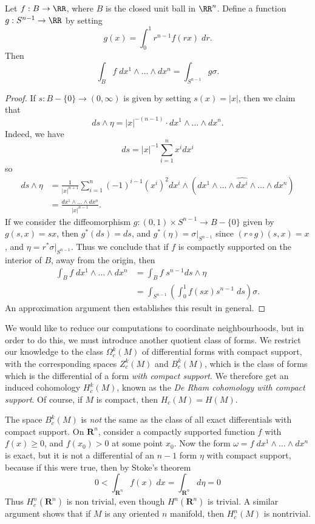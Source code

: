 \begin{theorem}
    Let $f: B \to \RR$, where $B$ is the closed unit ball in $\RR^n$. Define a function $g: S^{n-1} \to \RR$ by setting
    \[ g(x) = \int_0^1 r^{n-1} f(rx)\; dr. \]
    Then
    \[ \int_B f\; dx^1 \wedge \dots \wedge dx^n = \int_{S^{n-1}} g \sigma. \]
\end{theorem}
\begin{proof}
    If $s: B - \{ 0 \} \to (0,\infty)$ is given by setting $s(x) = |x|$, then we claim that
    \[ ds \wedge \eta = |x|^{-(n-1)} \cdot dx^1 \wedge \dots \wedge dx^n. \]
    Indeed, we have
    \[ ds = |x|^{-1} \sum_{i = 1}^n x^i dx^i \]
    so
    \begin{align*}
        ds \wedge \eta &= \frac{1}{|x|^{n+1}} \sum_{i = 1}^n (-1)^{i-1} (x^i)^2 dx^i \wedge (dx^1 \wedge \dots \wedge \widehat{dx^i} \wedge \dots \wedge dx^n)\\
        &= \frac{dx^1 \wedge \dots \wedge dx^n}{|x|^{n-1}}.
    \end{align*}
    If we consider the diffeomorphism $g: (0,1) \times S^{n-1} \to B - \{ 0 \}$ given by $g(s,x) = sx$, then $g^*(ds) = ds$, and $g^*(\eta) = \sigma|_{S^{n-1}}$ since $(r \circ g)(s,x) = x$, and $\eta = r^* \sigma|_{S^{n-1}}$. Thus we conclude that if $f$ is compactly supported on the interior of $B$, away from the origin, then
    \begin{align*}
        \int_B f\; dx^1 \wedge \dots \wedge dx^n &= \int_B f\; s^{n-1} ds \wedge \eta\\
        &= \int_{S^{n-1}} \left( \int_0^1 f(sx) s^{n-1}\; ds \right) \sigma.
    \end{align*}
    An approximation argument then establishes this result in general.
\end{proof}

We would like to reduce our computations to coordinate neighbourhoods, but in order to do this, we must introduce another quotient class of forms. We restrict our knowledge to the class $\Omega^k_c(M)$ of differential forms with compact support, with the corresponding spaces $Z^k_c(M)$ and $B^k_c(M)$, which is the class of forms which is the differential of a form {\it with compact support}. We therefore get an induced cohomology $H^k_c(M)$, known as the \emph{De Rham cohomology with compact support}. Of course, if $M$ is compact, then $H_c(M) = H(M)$.

\begin{example}
    The space $B^k_c(M)$ is {\it not} the same as the class of all exact differentials with compact support. On $\mathbf{R}^n$, consider a compactly supported function $f$ with $f(x) \geq 0$, and $f(x_0) > 0$ at some point $x_0$. Now the form $\omega = f\; dx^1 \wedge \dots \wedge dx^n$ is exact, but it is not a differential of an $n-1$ form $\eta$ with compact support, because if this were true, then by Stoke's theorem
    \[ 0 < \int_{\mathbf{R}^n} f(x)\; dx = \int_{\mathbf{R}^n} d\eta = 0 \]
    Thus $H^n_c(\mathbf{R}^n)$ is non trivial, even though $H^n(\mathbf{R}^n)$ is trivial. A similar argument shows that if $M$ is any oriented $n$ manifold, then $H^n_c(M)$ is nontrivial.
\end{example}

